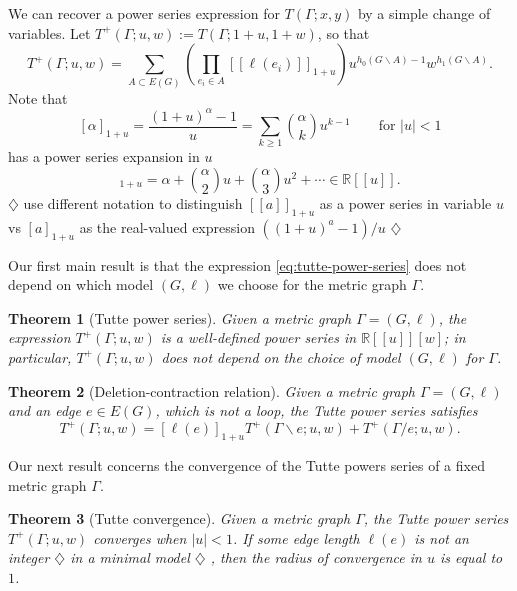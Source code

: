 \documentclass{amsart}
\newtheorem{thm}{Theorem}
\theoremstyle{definition}
\newcommand{\RR}{\mathbb{R}}
\newcommand{\fanalog}[2]{[\![#2]\!]_{#1}}
\newcommand{\harry}[1]{{\color{red} \sf $\diamondsuit$  {#1} $\diamondsuit$ }}
\newcommand{\note}[1]{\harry{#1}}
\begin{document}
We can recover a power series expression for $T(\Gamma; x,y)$ by a simple change of variables.
Let
$T^+(\Gamma; u,w) := T(\Gamma; 1 + u, 1 + w) $,
so that
\begin{equation}
\label{eq:tutte-power-series}
	T^+(\Gamma; u,w) = \sum_{A \subset E(G)} \left( \prod_{e_i \in A} \fanalog{1 + u}{\ell(e_i)} \right)
	u^{h_0(G\backslash A) - 1}w^{h_1(G\backslash A)} .
\end{equation}
Note that
\[ [\alpha]_{1+u} = \frac{(1+u)^\alpha - 1}{u}
= \sum_{k \geq 1} \binom{\alpha}{k}u^{k-1} 
\qquad \text{for } |u|<1
\]
has a power series expansion in $u$ 
\begin{equation}
[\alpha]_{1+u} = \alpha + \binom{\alpha}{2} u + \binom{\alpha}{3} u^2 + \cdots
\in \RR[[u]] .
\end{equation}
\note{use different notation to distinguish $\fanalog{1 + u}{a}$ as a power series in variable $u$ 
vs $[a]_{1+u}$ as the real-valued expression $((1+u)^a-1)/u$}

Our first main result is that the expression \eqref{eq:tutte-power-series} does not depend on which  model $(G,\ell)$ we choose for the metric graph $\Gamma$.
\begin{thm}[Tutte power series]
\label{thm:intro-tutte-series}
Given a metric graph $\Gamma = (G,\ell)$,
the expression $T^+(\Gamma; u,w)$
is a well-defined power series in
$\RR[[u]][w]$;
in particular,
$T^+(\Gamma; u,w)$ does not depend on the choice of model $(G,\ell)$ for $\Gamma$.
\end{thm}

\begin{thm}[Deletion-contraction relation]
\label{thm:deletion-contraction}
Given a metric graph $\Gamma = (G,\ell)$ and an edge $e \in E(G)$,
which is not a loop,
the Tutte power series satisfies
\begin{equation*}
T^+(\Gamma; u,w) = [\ell(e)]_{1+u} T^+(\Gamma \backslash e; u,w) + T^+(\Gamma / e; u,w).
\end{equation*}
\end{thm}

Our next result concerns the convergence of the Tutte powers series of a fixed metric graph $\Gamma$.
\begin{thm}[Tutte convergence]
\label{thm:tutte-convergence}
Given a metric graph $\Gamma$,
the Tutte power series $T^+(\Gamma;u,w)$ converges when $|u|<1$.
If some edge length $\ell(e)$ is not an integer \note{in a minimal model},
then the radius of convergence in $u$ is equal to $1$.
\end{thm}
\end{document}
